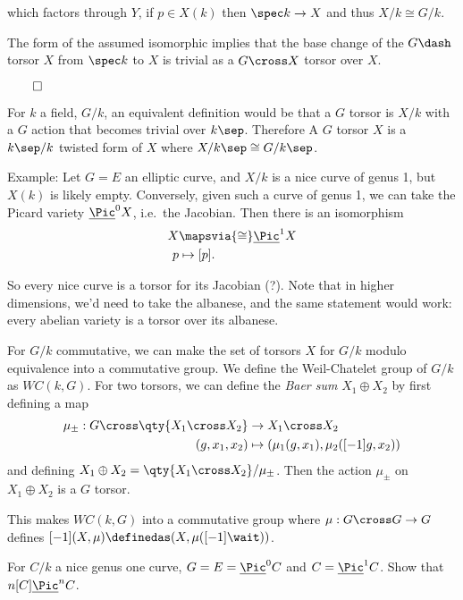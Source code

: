 which factors through \(Y\), if \(p\in X(k)\) then \(\spec k\to X\) and
thus \(X/k \cong G/k\).

The form of the assumed isomorphic implies that the base change of the
\(G\dash\)torsor \(X\) from \(\spec k\) to \(X\) is trivial as a
\(G\cross X\) torsor over \(X\).

\(\qed\)

For \(k\) a field, \(G/k\), an equivalent definition would be that a
\(G\) torsor is \(X/k\) with a \(G\) action that becomes trivial over
\(k\sep\). Therefore A \(G\) torsor \(X\) is a \(k\sep /k\) twisted form
of \(X\) where \(X/k\sep \cong G/k\sep\).

Example: Let \(G = E\) an elliptic curve, and \(X/k\) is a nice curve of
genus 1, but \(X(k)\) is likely empty. Conversely, given such a curve of
genus 1, we can take the Picard variety \(\underline{\Pic}^0 X\),
i.e.~the Jacobian. Then there is an isomorphism \begin{align*}
X &\mapsvia{\cong} \underline{\Pic}^1 X \\
p &\mapsto [p]
.\end{align*}

So every nice curve is a torsor for its Jacobian (?). Note that in
higher dimensions, we'd need to take the albanese, and the same
statement would work: every abelian variety is a torsor over its
albanese.

For \(G/k\) commutative, we can make the set of torsors \(X\) for
\(G/k\) modulo equivalence into a commutative group. We define the
Weil-Chatelet group of \(G/k\) as \(WC(k, G)\). For two torsors, we can
define the \emph{Baer sum} \(X_1 \oplus X_2\) by first defining a map
\begin{align*}
\mu_{\pm}: G\cross \qty{X_1 \cross X_2} &\to X_1 \cross X_2 \\
(g, x_1, x_2) &\mapsto (\mu_1(g, x_1), \mu_2([-1]g, x_2)  )
\end{align*} and defining
\(X_1 \oplus X_2 = \qty{X_1 \cross X_2} / \mu_{\pm}\). Then the action
\(\mu_{\pm}\) on \(X_1 \oplus X_2\) is a \(G\) torsor.

This makes \(WC(k , G)\) into a commutative group where
\(\mu: G\cross G\to G\) defines
\([-1](X, \mu) \definedas (X, \mu([-1]\wait ))\).

\begin{description}
\tightlist
\item[Exercise]
For \(C/k\) a nice genus one curve, \(G = E = \underline{\Pic}^0 C\) and
\(C = \underline{\Pic}^1 C\). Show that \(n[C] \underline{\Pic}^n C\).
\end{description}

